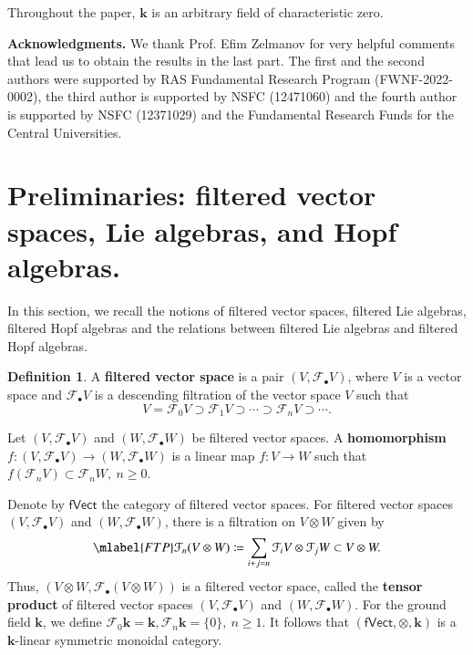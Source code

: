 \documentclass[12pt]{amsart}
\theoremstyle{definition}   %
\newtheorem{defi}[thm]{Definition}
\newcommand{\bk}{{\mathbf{k}}}
\newcommand{\huaF}{\mathcal{F}}
\newcommand{\fVec}{\mathsf{fVect}}
\begin{document}


Throughout the paper, $\bk$ is an arbitrary field of characteristic zero.\vspace{2mm}

\noindent
{\bf Acknowledgments.} We thank Prof. Efim Zelmanov for very helpful comments that lead us to obtain the results in the last part.
The first and the second authors were supported by RAS Fundamental Research Program (FWNF-2022-0002), the third author is supported by
NSFC (12471060) and the fourth author is supported by
NSFC (12371029) and the Fundamental Research Funds for the Central Universities.



\section{Preliminaries: filtered vector spaces, Lie algebras, and Hopf algebras.} \label{sec:pre}

In this section, we recall the notions of filtered vector spaces, filtered Lie algebras, filtered Hopf algebras and the relations between filtered Lie algebras and filtered Hopf algebras.

\begin{defi}
A {\bf   filtered vector space} is a pair $(V,\huaF_{\bullet}V)$, where $V$ is a vector space and $\huaF_{\bullet}V$ is a descending
filtration of the  vector space $V$ such that $$V=\huaF_0V\supset\huaF_1V\supset\cdots\supset\huaF_n V\supset\cdots.$$

Let $(V,\huaF_{\bullet}V)$ and $(W,\huaF_{\bullet}W)$ be filtered  vector spaces. A {\bf homomorphism} $f:(V,\huaF_{\bullet}V)\to (W,\huaF_{\bullet}W)$ is a linear map $f:V\to W$ such that $f(\huaF_n V)\subset \huaF_n W,~n\geq 0.$
\end{defi}

Denote by  $\fVec$ the category of filtered vector spaces.
For filtered vector spaces $(V,\huaF_{\bullet}V)$ and $(W,\huaF_{\bullet}W)$, there is a filtration on $V\otimes W$   given by
\begin{eqnarray}\mlabel{FTP}
\huaF_n(V\otimes W)\coloneqq \sum_{i+j=n}\huaF_iV\otimes\huaF_jW\subset V\otimes W.
\end{eqnarray}
Thus, $(V\otimes W,\huaF_{\bullet}(V\otimes W))$ is a filtered vector space, called the  {\bf tensor product} of filtered vector spaces  $(V,\huaF_{\bullet}V)$ and $(W,\huaF_{\bullet}W)$. For the ground field $\bk$, we define $\huaF_0\bk=\bk,\huaF_n\bk=\{0\},~n\geq 1$. It follows that $(\fVec,\otimes,\bk)$ is a $\bk$-linear  symmetric monoidal category.
\end{document}
